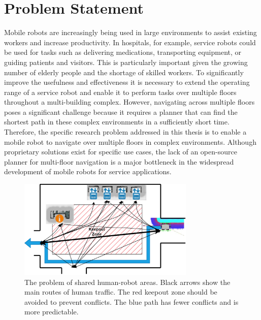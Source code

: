 \section{Problem Statement}
\label{sec:problem_statement}
Mobile robots are increasingly being used in large environments to assist existing workers and increase productivity. In hospitals, for example, service robots could be used for tasks such as delivering medications, transporting equipment, or guiding patients and visitors. This is particularly important given the growing number of elderly people and the shortage of skilled workers. To significantly improve the usefulness and effectiveness it is necessary to extend the operating range of a service robot and enable it to perform tasks over multiple floors throughout a multi-building complex. However, navigating across multiple floors poses a significant challenge because it requires a planner that can find the shortest path in these complex environments in a sufficiently short time. Therefore, the specific research problem addressed in this thesis is to enable a mobile robot to navigate over multiple floors in complex environments. Although proprietary solutions exist for specific use cases, the lack of an open-source planner for multi-floor navigation is a major bottleneck in the widespread development of mobile robots for service applications.

\begin{figure}[h]
    \centering
    \includegraphics[width=0.75\textwidth]{figures/10_introduction/straight_path_problem.png}
    \caption[The problem of shared human-robot areas]{The problem of shared human-robot areas. Black arrows show the main routes of human traffic. The red keepout zone should be avoided to prevent conflicts. The blue path has fewer conflicts and is more predictable.}
    \label{fig:straight_path_problem}
\end{figure}

